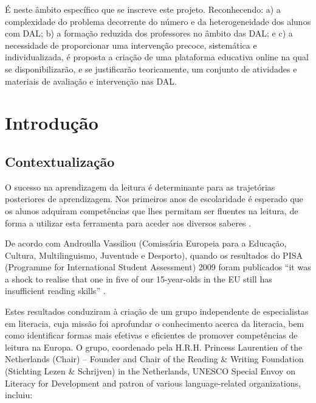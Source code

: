 \documentclass[
  oneside,
  11pt, a4paper,
  footinclude=true,
  headinclude=true,
  cleardoublepage=empty
]{scrbook}
\begin{document}
É  neste âmbito  específico  que se inscreve este projeto. Reconhecendo: a) a complexidade do problema decorrente do número e da heterogeneidade dos alunos com DAL; b) a formação reduzida dos professores no âmbito das DAL; e c) a necessidade de proporcionar uma intervenção precoce, sistemática e individualizada, é proposta a criação de uma plataforma educativa online na qual se disponibilizarão, e se justificarão teoricamente, um conjunto de atividades e materiais de avaliação e intervenção nas DAL.

\cleardoublepage
	
	\setcounter{page}{3}
	\rm
	
	\cleardoublepage
	\tableofcontents
	
	\cleardoublepage
	\setcounter{page}{3}

\chapter{Introdução}

\section{Contextualização}
O sucesso na aprendizagem da leitura é determinante para as trajetórias posteriores de aprendizagem. Nos primeiros anos de escolaridade é esperado que os alunos adquiram competências que lhes permitam ser fluentes na leitura, de forma a utilizar esta ferramenta para aceder aos diversos saberes \citep{Outon}.

De acordo com Androulla Vassiliou (Comissária Europeia para a Educação, Cultura, Multilinguismo, Juventude e Desporto), quando os resultados do PISA (Programme for International Student Assessment) 2009 foram publicados “it was a shock to realise that one in five of our 15-year-olds in the EU still has insufficient reading skills” \citep{European}.

Estes resultados conduziram à criação de um grupo independente de especialistas em literacia, cuja missão foi aprofundar o conhecimento acerca da literacia, bem como identificar formas mais efetivas e eficientes de promover competências de leitura na Europa. O grupo, coordenado pela H.R.H. Princess Laurentien of the Netherlands (Chair) – Founder and Chair of the Reading \& Writing Foundation (Stichting Lezen \& Schrijven) in the Netherlands, UNESCO Special Envoy on Literacy for Development and patron of various language-related organizations, incluiu: 
\end{document}
